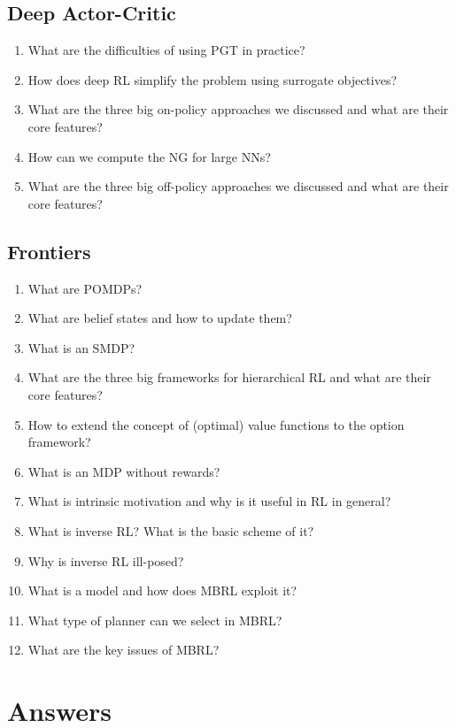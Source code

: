 		\subsection{Deep Actor-Critic}
			\begin{enumerate}
				\item What are the difficulties of using \ac{PGT} in practice?
				\item How does deep \ac{RL} simplify the problem using surrogate objectives?
				\item What are the three big on-policy approaches we discussed and what are their core features?
				\item How can we compute the \ac{NG} for large \acp{NN}?
				\item What are the three big off-policy approaches we discussed and what are their core features?
			\end{enumerate}

		\subsection{Frontiers}
			\begin{enumerate}
				\item What are \acp{POMDP}?
				\item What are belief states and how to update them?
				\item What is an \ac{SMDP}?
				\item What are the three big frameworks for hierarchical \ac{RL} and what are their core features?
				\item How to extend the concept of (optimal) value functions to the option framework?
				\item What is an \ac{MDP} without rewards?
				\item What is intrinsic motivation and why is it useful in \ac{RL} in general?
				\item What is inverse \ac{RL}? What is the basic scheme of it?
				\item Why is inverse \ac{RL} ill-posed?
				\item What is a model and how does \ac{MBRL} exploit it?
				\item What type of planner can we select in \ac{MBRL}?
				\item What are the key issues of \ac{MBRL}?
			\end{enumerate}

	\section{Answers}
